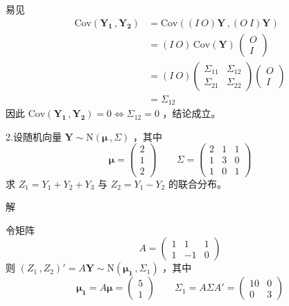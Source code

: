 \documentclass[12pt,hyperref,]{ctexart}
\begin{document}
易见 \begin{equation*}
\begin{aligned}
\mathrm{Cov}(\boldsymbol{Y_1}\, ,\boldsymbol{Y_2}) &= \mathrm{Cov}\left((I\  O)\boldsymbol{Y}\, ,(O\  I)\boldsymbol{Y}\right) \\
&= (I\  O)\, \mathrm{Cov}(\boldsymbol{Y})\,
\begin{pmatrix}
O \\
I
\end{pmatrix} \\
&= (I\  O)
\begin{pmatrix}
\Sigma_{11} & \Sigma_{12} \\
\Sigma_{21} & \Sigma_{22}
\end{pmatrix}
\begin{pmatrix}
O \\
I
\end{pmatrix} \\
&=\Sigma_{12}
\end{aligned}
\end{equation*}因此
\(\mathrm{Cov}(\boldsymbol{Y_1}\, ,\boldsymbol{Y_2})=0 \Leftrightarrow \Sigma_{12}=0\)
，结论成立。

\vspace{3em}

\kaishu

2.设随机向量
\(\boldsymbol{Y}\sim \mathrm{N}(\boldsymbol{\mu}\, ,\Sigma)\) ，其中
\begin{equation*}
\boldsymbol{\mu}=
\begin{pmatrix}
2 \\
1 \\
2
\end{pmatrix} \qquad
\Sigma=
\begin{pmatrix}
2 & 1 & 1 \\
1 & 3 & 0 \\
1 & 0 & 1
\end{pmatrix}
\end{equation*}求 \(Z_1=Y_1+Y_2+Y_3\) 与 \(Z_2=Y_1-Y_2\) 的联合分布。

\vspace{1em}

\heiti

解

\songti

令矩阵 \begin{equation*}
A=
\begin{pmatrix}
1 & 1 & 1 \\
1 &  -1 & 0 
\end{pmatrix}
\end{equation*}则
\((Z_1\, ,Z_2)'=A\boldsymbol{Y}\sim \mathrm{N}(\boldsymbol{\mu_1}\, ,\Sigma_1)\)
，其中 \begin{equation*}
\boldsymbol{\mu_1}=A\boldsymbol{\mu}=
\begin{pmatrix}
5 \\
1
\end{pmatrix}
\qquad \Sigma_1=A\Sigma A'=
\begin{pmatrix}
10 & 0 \\
0 & 3
\end{pmatrix}
\end{equation*}
\end{document}
